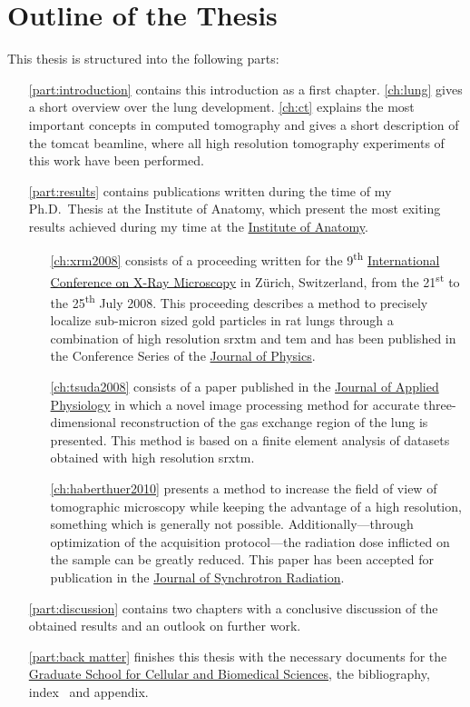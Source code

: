 \section{Outline of the Thesis}
This thesis is structured into the following parts:
\begin{itemize}
	\item [\autoref{part:introduction}] contains this introduction as a first chapter. \autoref{ch:lung} gives a short overview over the lung development. \autoref{ch:ct} explains the most important concepts in computed tomography and gives a short description of the \ac{tomcat} beamline, where all high resolution tomography experiments of this work have been performed.
	\item [\autoref{part:results}] contains publications written during the time of my Ph.D.\ Thesis at the Institute of Anatomy, which present the most exiting results achieved during my time at the \href{http://www.ana.unibe.ch/index_e.jsp}{Institute of Anatomy}.
	\begin{itemize}
		\item [\autoref{ch:xrm2008}] consists of a proceeding written for the 9\textsuperscript{th} \href{http://xrm2008.web.psi.ch/}{International Conference on X-Ray Microscopy} in Zürich, Switzerland, from the 21\textsuperscript{st} to the 25\textsuperscript{th} July 2008. This proceeding describes a method to precisely localize sub-micron sized gold particles in rat lungs through a combination of high resolution \acl{srxtm} and \acl{tem} and has been published in the Conference Series of the \href{http://iopscience.iop.org/1742-6596/}{Journal of Physics}.
		
		\item [\autoref{ch:tsuda2008}] consists of a paper published in the \href{http://jap.physiology.org/}{Journal of Applied Physiology} in which a novel image processing method for accurate three-dimensional reconstruction of the gas exchange region of the lung is presented. This method is based on a finite element analysis of datasets obtained with high resolution \acl{srxtm}.

		\item [\autoref{ch:haberthuer2010}] presents a method to increase the field of view of tomographic microscopy while keeping the advantage of a high resolution, something which is generally not possible. Additionally---through optimization of the acquisition protocol---the radiation dose inflicted on the sample can be greatly reduced. This paper has been accepted for publication in the \href{http://journals.iucr.org/s/}{Journal of Synchrotron Radiation}.
	\end{itemize}
	\item [\autoref{part:discussion}] contains two chapters with a conclusive discussion of the obtained results and an outlook on further work.
	\item [\autoref{part:back matter}] finishes this thesis with the necessary documents for the \href{http://www.gcb.unibe.ch}{Graduate School for Cellular and Biomedical Sciences}, the bibliography, index~ and appendix.
\end{itemize}